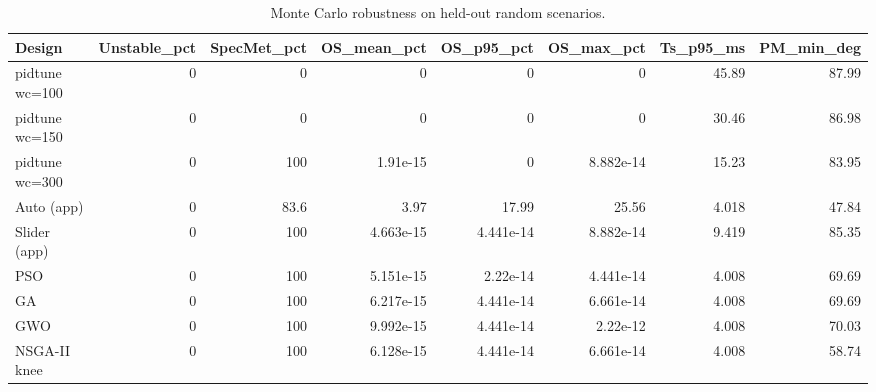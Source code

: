 \begin{table}[t]
\centering\caption{Monte Carlo robustness on held-out random scenarios.}\label{tab:mc}
\begin{tabular}{lrrrrrrr}
\toprule
Design & Unstable\_pct & SpecMet\_pct & OS\_mean\_pct & OS\_p95\_pct & OS\_max\_pct & Ts\_p95\_ms & PM\_min\_deg \\
\midrule
pidtune wc=100 & 0 & 0 & 0 & 0 & 0 & 45.89 & 87.99 \\
pidtune wc=150 & 0 & 0 & 0 & 0 & 0 & 30.46 & 86.98 \\
pidtune wc=300 & 0 & 100 & 1.91e-15 & 0 & 8.882e-14 & 15.23 & 83.95 \\
Auto (app) & 0 & 83.6 & 3.97 & 17.99 & 25.56 & 4.018 & 47.84 \\
Slider (app) & 0 & 100 & 4.663e-15 & 4.441e-14 & 8.882e-14 & 9.419 & 85.35 \\
PSO & 0 & 100 & 5.151e-15 & 2.22e-14 & 4.441e-14 & 4.008 & 69.69 \\
GA & 0 & 100 & 6.217e-15 & 4.441e-14 & 6.661e-14 & 4.008 & 69.69 \\
GWO & 0 & 100 & 9.992e-15 & 4.441e-14 & 2.22e-12 & 4.008 & 70.03 \\
NSGA-II knee & 0 & 100 & 6.128e-15 & 4.441e-14 & 6.661e-14 & 4.008 & 58.74 \\
\bottomrule
\end{tabular}
\end{table}
